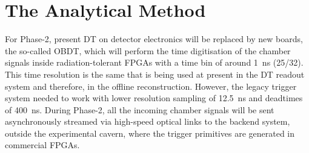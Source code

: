 \documentclass[../main.tex]{subfiles}
\begin{document}
\chapter{The Analytical Method}
\label{dts:chapter:intro}

For Phase-2, present DT on detector electronics will be replaced by new boards, the so-called OBDT, which will perform the time digitisation of the chamber signals inside radiation-tolerant FPGAs with a time bin of around 1~ns (25/32). This time resolution is the same that is being used at present in the DT readout system and therefore, in the offline reconstruction. However, the legacy trigger system needed to work with lower resolution sampling of 12.5~ns and deadtimes of 400~ns. During Phase-2, all the incoming chamber signals will be sent asynchronously streamed via high-speed optical links to the backend system, outside the experimental cavern, where the trigger primitives are generated in commercial FPGAs. 
\end{document}

